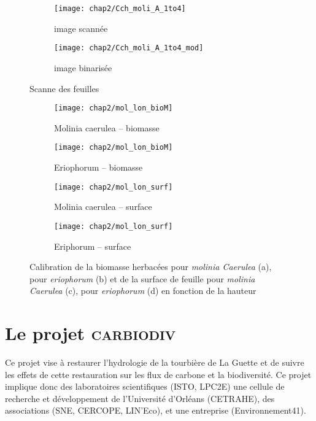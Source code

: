 \begin{figure}
	\centering
	\begin{subfigure}[t]{0.5\textwidth}
		\centering
		\texttt{[image: chap2/Cch\_moli\_A\_1to4]}
		\caption{image scannée}
	\end{subfigure}%
	\begin{subfigure}[t]{0.5\textwidth}
		\centering
		\texttt{[image: chap2/Cch\_moli\_A\_1to4\_mod]}
		\caption{image binarisée}
	\end{subfigure}
\caption{Scanne des feuilles}
\label{fig:scan_mol}
\end{figure}


\begin{figure}
	\centering
	\begin{subfigure}[t]{0.5\textwidth}
		\centering
		\texttt{[image: chap2/mol\_lon\_bioM]}
		\caption{Molinia caerulea -- biomasse}
	\end{subfigure}%
	\begin{subfigure}[t]{0.5\textwidth}
		\centering
		\texttt{[image: chap2/mol\_lon\_bioM]}
		\caption{Eriophorum -- biomasse}
	\end{subfigure}
	
	
	\begin{subfigure}[t]{0.5\textwidth}
		\centering
		\texttt{[image: chap2/mol\_lon\_surf]}
		\caption{Molinia caerulea -- surface}
	\end{subfigure}%
	\begin{subfigure}[t]{0.5\textwidth}
		\centering
		\texttt{[image: chap2/mol\_lon\_surf]}
		\caption{Eriphorum -- surface}
	\end{subfigure}
\caption{Calibration de la biomasse herbacées pour \textit{molinia Caerulea} (a), pour \textit{eriophorum} (b) et de la surface de feuille pour \textit{molinia Caerulea} (c), pour \textit{eriophorum} (d) en fonction de la hauteur}
\label{fig:cal_herb}
\end{figure}


\section{Le projet \textsc{carbiodiv}}
\label{sec:carbiodiv}

Ce projet vise à restaurer l'hydrologie de la tourbière de La Guette et de suivre les effets de cette restauration sur les flux de carbone et la biodiversité.
Ce projet implique donc des laboratoires scientifiques (ISTO, LPC2E) une cellule de recherche et développement de l'Université d'Orléans (CETRAHE), des associations (SNE, CERCOPE, LIN'Eco), et une entreprise (Environnement41).

